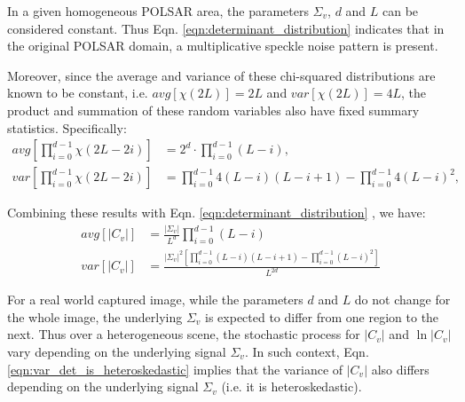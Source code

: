 \documentclass[journal]{IEEEtran}
\begin{document}
In a given homogeneous POLSAR area, the parameters $\Sigma_v$, $d$ and $L$ can be considered constant.
Thus Eqn. \ref{eqn:determinant_distribution} indicates that 
  in the original POLSAR domain, a multiplicative speckle noise pattern is present.

Moreover, since the average and variance of these chi-squared distributions %
  are known to be constant, i.e. $avg \left[ \chi(2L) \right] = 2L$ and $var \left[ \chi(2L) \right] = 4L$,
  the product and summation of these random variables also have fixed summary statistics.
Specifically:
{\footnotesize
\begin{align*}
  avg \left[ \prod^{d-1}_{i=0} \chi(2L-2i) \right] &= 2^d \cdot \prod^{d-1}_{i=0} (L-i), \\
  var \left[ \prod^{d-1}_{i=0} \chi(2L-2i) \right] &= \prod^{d-1}_{i=0} 4(L-i)(L-i+1) - \prod^{d-1}_{i=0} 4(L-i)^2, %
\end{align*}
}

Combining these results with Eqn. \ref{eqn:determinant_distribution} %
  , we have:
{\footnotesize
\begin{align}
  avg \left[ |C_v| \right]  &= \frac{|\Sigma_v|}{L^d} \prod^{d-1}_{i=0} (L-i)\\
  var \left[ |C_v| \right]  &=   \frac{|\Sigma_v|^2 \left[ \prod^{d-1}_{i=0} (L-i)(L-i+1) - \prod^{d-1}_{i=0} (L-i)^2 \right] }{L^{2d}} \label{eqn:var_det_is_heteroskedastic}%
\end{align}
}

For a real world captured image, while the parameters $d$ and $L$ do not change for the whole image,
  the underlying $\Sigma_v$ is expected to differ from one region to the next.
Thus over a heterogeneous scene, the stochastic process for $|C_v|$ and $\ln |C_v|$ vary depending on the underlying signal $\Sigma_v$. 
In such context, Eqn. \ref{eqn:var_det_is_heteroskedastic} implies that the variance of $|C_v|$ also differs depending on the underlying signal $\Sigma_v$ (i.e. it is   heteroskedastic).
\end{document}
